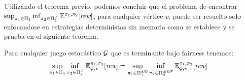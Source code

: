Utilizando el teorema previo, podemos concluir que el problema de encontrar $\sup_{\pi_{1} \in \Pi_{1}} \inf_{\pi_{2} \in \Pi^{\mathcal{F}}_{2}} \mathbb{E}^{\pi_{1}, \pi_{2}}[\textit{rew}]$, para cualquier vértice $v$, puede ser resuelto solo enfocandose en estrategias deterministas sin memoria como se establece y se prueba en el siguiente teorema.
%
\begin{theorem}\label{th:reduce-to-memoryless}
  Para cualquier juego estocástico $\mathcal{G}$  que es terminante bajo fairness tenemos:
  \[
  \adjustlimits \sup_{\strat{1} \in \Strategies{1}} \inf_{\strat{2} \in \FairStrats{2}} \Expect{\strat{1}}{\strat{2}}_{\StochG,v}[\Rewards]
  =
  \adjustlimits \sup_{\strat{1} \in \DetMemorylessStrats{1}} \inf_{\strat{2} \in \DetMemorylessFairStrats{2}} \Expect{\strat{1}}{\strat{2}}_{\StochG,v}[\Rewards]
 \]
\end{theorem}
%
